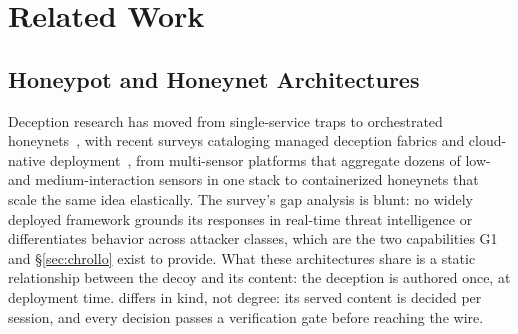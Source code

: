 \section{Related Work}
\label{sec:related}

\subsection{Honeypot and Honeynet Architectures}
Deception research has moved from single-service traps to orchestrated
honeynets~\cite{spitzner2002}, with recent surveys cataloging managed
deception fabrics and cloud-native deployment~\cite{lopez2024}, from
multi-sensor platforms that aggregate dozens of low- and
medium-interaction sensors in one stack to containerized honeynets that
scale the same idea elastically. The survey's gap analysis is blunt: no
widely deployed framework grounds its responses in real-time threat
intelligence or differentiates behavior across attacker classes, which
are the two capabilities G1 and \S\ref{sec:chrollo} exist to provide.
What these architectures share is a static
relationship between the decoy and its content: the deception is authored
once, at deployment time. \system differs in kind, not degree: its served
content is decided per session, and every decision passes a verification
gate before reaching the wire.

